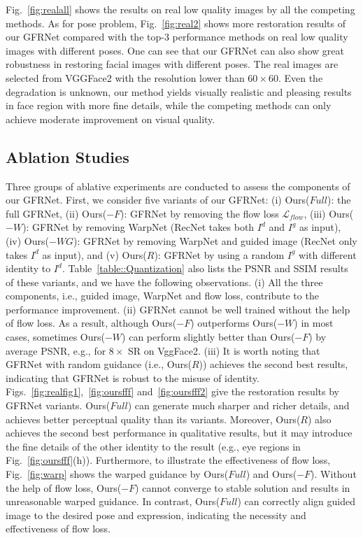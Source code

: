 \documentclass[runningheads]{llncs}
\begin{document}
Fig.~\ref{fig:realall} shows the results on real low quality images by all the competing methods. As for pose problem, Fig.~\ref{fig:real2} shows more restoration results of our GFRNet compared with the top-3 performance methods on real low quality images with different poses. One can see that our GFRNet can also show great robustness in restoring facial images with different poses.
The real images are selected from VGGFace2 with the resolution lower than $60 \times 60$.
Even the degradation is unknown, our method yields visually realistic and pleasing results in face region with more fine details, while the competing methods can only achieve moderate improvement on visual quality.

\subsection{Ablation Studies}
Three groups of ablative experiments are conducted to assess the components of our GFRNet.
First, we consider five variants of our GFRNet:
(i) Ours($Full$): the full GFRNet,
(ii) Ours($-F$): GFRNet by removing the flow loss $\mathcal{L}_{flow}$,
(iii) Ours($-W$): GFRNet by removing WarpNet (RecNet takes both $I^d$ and $I^g$ as input),
(iv) Ours($-WG$): GFRNet by removing WarpNet and guided image (RecNet only takes $I^d$ as input),
and (v) Ours($R$): GFRNet by using a random $I^g$ with different identity to $I^d$.
Table~\ref{table::Quantization} also lists the PSNR and SSIM results of these variants, and we have the following observations.
(i) All the three components, i.e., guided image, WarpNet and flow loss, contribute to the performance improvement.
(ii) GFRNet cannot be well trained without the help of flow loss.
As a result, although Ours($-F$) outperforms Ours($-W$) in most cases, sometimes Ours($-W$) can perform slightly better than Ours($-F$) by average PSNR, e.g., for $8\times$ SR on VggFace2.
(iii) It is worth noting that GFRNet with random guidance (i.e., Ours($R$)) achieves the second best results, indicating that GFRNet is robust to the misuse of identity.
Figs.~\ref{fig:realfig1},~\ref{fig:oursfff} and~\ref{fig:oursfff2} give the restoration results by GFRNet variants.
Ours($Full$) can generate much sharper and richer details, and achieves better perceptual quality than its variants.
Moreover, Ours($R$) also achieves the second best performance in qualitative results, but it may introduce the fine details of the other identity to the result (e.g., eye regions in Fig.~\ref{fig:oursfff}(h)).
Furthermore, to illustrate the effectiveness of flow loss, Fig.~\ref{fig:warp} shows the warped guidance by Ours($Full$) and Ours($-F$).
Without the help of flow loss, Ours($-F$) cannot converge to stable solution and results in unreasonable warped guidance.
In contrast, Ours($Full$) can correctly align guided image to the desired pose and expression, indicating the necessity and effectiveness of flow loss.
\end{document}
